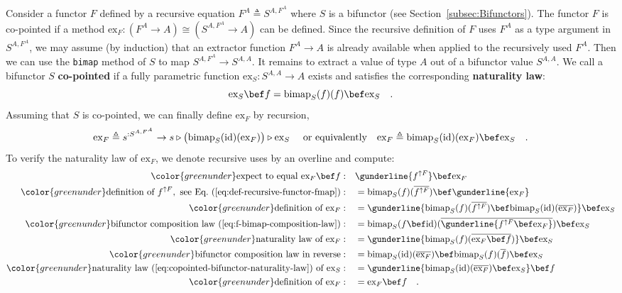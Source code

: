 Consider a functor $F$ defined by a recursive equation $F^{A}\triangleq S^{A,F^{A}}$
where $S$ is a bifunctor (see Section~\ref{subsec:Bifunctors}).
The functor $F$ is co-pointed if a method $\text{ex}_{F}:(F^{A}\rightarrow A)\cong(S^{A,F^{A}}\rightarrow A)$
can be defined. Since the recursive definition of $F$ uses $F^{A}$
as a type argument in $S^{A,F^{A}}$, we may assume (by induction)
that an extractor function $F^{A}\rightarrow A$ is already available
when applied to the recursively used $F^{A}$. Then we can use the
\lstinline!bimap! method of $S$ to map $S^{A,F^{A}}\rightarrow S^{A,A}$.
It remains to extract a value of type $A$ out of a bifunctor value
$S^{A,A}$. We call a bifunctor $S$ \textbf{co-pointed}
if a fully parametric function $\text{ex}_{S}:S^{A,A}\rightarrow A$
exists and satisfies the corresponding \textbf{naturality law}:
\begin{equation}
\text{ex}_{S}\bef f=\text{bimap}_{S}(f)(f)\bef\text{ex}_{S}\quad.\label{eq:copointed-bifunctor-naturality-law}
\end{equation}
Assuming that $S$ is co-pointed, we can finally define $\text{ex}_{F}$
by recursion,
\[
\text{ex}_{F}\triangleq s^{:S^{A,F^{A}}}\rightarrow s\triangleright\big(\text{bimap}_{S}(\text{id})(\text{ex}_{F})\big)\triangleright\text{ex}_{S}\quad\text{ or equivalently}\quad\text{ex}_{F}\triangleq\text{bimap}_{S}(\text{id})(\text{ex}_{F})\bef\text{ex}_{S}\quad.
\]
To verify the naturality law of $\text{ex}_{F}$, we denote recursive
uses by an overline and compute:
\begin{align*}
{\color{greenunder}\text{expect to equal }\text{ex}_{F}\bef f:}\quad & \gunderline{f^{\uparrow F}}\bef\text{ex}_{F}\\
{\color{greenunder}\text{definition of }f^{\uparrow F},\text{ see Eq.~(\ref{eq:def-recursive-functor-fmap})}:}\quad & =\text{bimap}_{S}(f)(\overline{f^{\uparrow F}})\bef\gunderline{\text{ex}_{F}}\\
{\color{greenunder}\text{definition of }\text{ex}_{F}:}\quad & =\gunderline{\text{bimap}_{S}(f)(\overline{f^{\uparrow F}})\bef\text{bimap}_{S}(\text{id})(\overline{\text{ex}_{F}})}\bef\text{ex}_{S}\\
{\color{greenunder}\text{bifunctor composition law~(\ref{eq:f-bimap-composition-law})}:}\quad & =\text{bimap}_{S}(f\bef\text{id})(\overline{\gunderline{f^{\uparrow F}\bef\text{ex}_{F}}})\bef\text{ex}_{S}\\
{\color{greenunder}\text{naturality law of }\text{ex}_{F}:}\quad & =\gunderline{\text{bimap}_{S}(f)(\overline{\text{ex}_{F}\bef f})}\bef\text{ex}_{S}\\
{\color{greenunder}\text{bifunctor composition law in reverse}:}\quad & =\text{bimap}_{S}(\text{id})(\overline{\text{ex}_{F}})\bef\text{bimap}_{S}(f)(\overline{f})\bef\text{ex}_{S}\\
{\color{greenunder}\text{naturality law~(\ref{eq:copointed-bifunctor-naturality-law}) of }\text{ex}_{S}:}\quad & =\gunderline{\text{bimap}_{S}(\text{id})(\overline{\text{ex}_{F}})\bef\text{ex}_{S}}\bef f\\
{\color{greenunder}\text{definition of }\text{ex}_{F}:}\quad & =\text{ex}_{F}\bef f\quad.
\end{align*}
